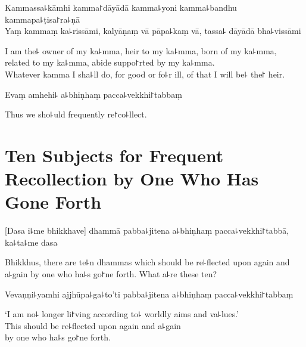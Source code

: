 \clearpage

%
Kammassa꜕kāmhi kamma꜓dāyādā kamma꜕yoni kamma꜕bandhu kammapa꜕ṭisa꜓ra꜕ṇā\\
Yaṃ kammaṃ ka꜕rissāmi, kalyāṇaṃ vā pāpa꜕kaṃ vā, tassa꜕ dāyādā bha꜕vissāmi

\begin{english}
  I am the꜕ owner of my ka꜕mma, heir to my ka꜕mma, born of my ka꜕mma,\\
  related to my ka꜕mma, abide suppo꜓rted by my ka꜕mma.\\
  Whatever kamma I sha꜕ll do, for good or fo꜕r ill, of that I will be꜕ the꜓ heir.
\end{english}

Evaṃ amhehi꜕ a꜕bhiṇhaṃ pacca꜕vekkhi꜓tabbaṃ

\begin{english}
  Thus we sho꜕uld frequently re꜓co꜕llect.
\end{english}

\chapter[Ten Subjects]{Ten Subjects for Frequent Recollection by One Who Has Gone Forth}%


\enlargethispage{\baselineskip}

\begin{leader}
\end{leader}

[Dasa i꜕me bhikkhave] dhammā pabba꜕jitena a꜕bhiṇhaṃ pacca꜕vekkhi꜓tabbā, ka꜕ta꜕me dasa

\begin{english}
  Bhikkhus, there are te꜕n dhammas which should be re꜕flected upon again and a꜕gain by one who ha꜕s go꜓ne forth. What a꜕re these ten?
\end{english}

Vevaṇṇi꜕yamhi ajjhūpa꜕ga꜕to'ti pabba꜕jitena a꜕bhiṇhaṃ pacca꜕vekkhi꜓tabbaṃ

\begin{english}
  `I am no꜕ longer li꜓ving according to꜕ worldly aims and va꜕lues.'\\
  This should be re꜕flected upon again and a꜕gain\\
  by one who ha꜕s go꜓ne forth.
\end{english}

